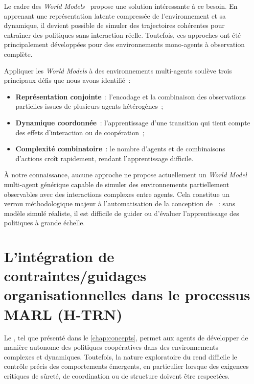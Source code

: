\medskip

\noindent
Le cadre des \textit{World Models}~\cite{Ha2018} propose une solution intéressante à ce besoin. En apprenant une représentation latente compressée de l'environnement et sa dynamique, il devient possible de simuler des trajectoires cohérentes pour entraîner des politiques sans interaction réelle. Toutefois, ces approches ont été principalement développées pour des environnements mono-agents à observation complète.

\noindent
Appliquer les \textit{World Models} à des environnements multi-agents soulève trois principaux défis que nous avons identifié~:
\begin{itemize}
  \item \textbf{Représentation conjointe}~: l'encodage et la combinaison des observations partielles issues de plusieurs agents hétérogènes~;
  \item \textbf{Dynamique coordonnée}~: l'apprentissage d'une transition qui tient compte des effets d'interaction ou de coopération~;
  \item \textbf{Complexité combinatoire}~: le nombre d’agents et de combinaisons d’actions croît rapidement, rendant l’apprentissage difficile.
\end{itemize}

\noindent
À notre connaissance, aucune approche ne propose actuellement un \textit{World Model} multi-agent générique capable de simuler des environnements partiellement observables avec des interactions complexes entre agents. Cela constitue un verrou méthodologique majeur à l'automatisation de la conception de ~: sans modèle simulé réaliste, il est difficile de guider ou d'évaluer l'apprentissage des politiques à grande échelle.

\section{L'intégration de contraintes/guidages organisationnelles dans le processus MARL (H-TRN)}

\noindent
Le , tel que présenté dans le \autoref{chap:concepts}, permet aux agents de développer de manière autonome des politiques coopératives dans des environnements complexes et dynamiques. Toutefois, la nature exploratoire du  rend difficile le contrôle précis des comportements émergents, en particulier lorsque des exigences critiques de sûreté, de coordination ou de structure doivent être respectées.

